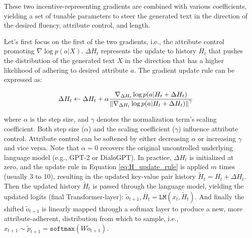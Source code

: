 These two incentive-representing gradients are combined with various coefficients, yielding a set of tunable parameters to steer the generated text in the direction of the desired fluency, attribute control, and length.

Let's first focus on the first of the two gradients, i.e., the attribute control promoting $\nabla \log p(a | X)$. $\Delta H_t$ represents the update to history $H_t$ that pushes the distribution of the generated text $X$ in the direction that has a higher likelihood of adhering to desired attribute $a$. The gradient update rule can be expressed as:

\begin{equation}
    \Delta H_t \leftarrow \Delta H_t + \alpha
    \frac{\nabla_{\Delta H_t} \log p(a | H_t + \Delta H_t)}
    {\norm{\nabla_{\Delta H_t} \log p(a | H_t + \Delta H_t)}^{\gamma}}
\label{eq:H_update_rule}
\end{equation}

where $\alpha$ is the step size, and $\gamma$ denotes the normalization term's scaling coefficient. Both step size ($\alpha$) and the scaling coefficient ($\gamma$) influence attribute control. Attribute control can be softened by either decreasing $\alpha$ or increasing $\gamma$ and vice versa. Note that $\alpha = 0$ recovers the original uncontrolled underlying language model (e.g., GPT-2 or DialoGPT). In practice, $\Delta H_t$ is initialized at zero, and the update rule in Equation \ref{eq:H_update_rule} is applied $m$ times (usually 3 to 10), resulting in the updated key-value pair history $\tilde{H}_t  = H_t + \Delta H_t$. Then the updated history $\tilde{H}_t$ is passed through the language model, yielding the updated logits (final Transformer-layer): $\tilde{o}_{t + 1}, H_t = \texttt{LM}(x_t, \tilde{H}_t)$. And finally the shifted $\tilde{o}_{t + 1}$ is linearly mapped through a softmax layer to produce a new, more attribute-adherent, distribution from which to sample, i.e., $x_{t + 1} \sim \tilde{p}_{t + 1} = \texttt{softmax} \left( W \tilde{o}_{t + 1} \right)$.


